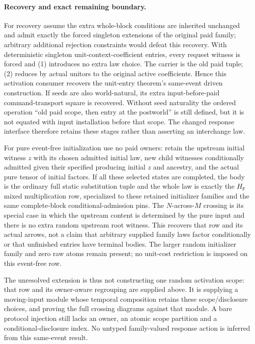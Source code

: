 \documentclass[11pt]{article}
\begin{document}
\paragraph{Recovery and exact remaining boundary.}
For recovery assume the extra whole-block conditions are inherited unchanged and admit exactly the forced singleton extensions of the original paid family; arbitrary additional rejection constraints would defeat this recovery. With deterministic singleton unit-context-coefficient entries, every request witness is forced and (1) introduces no extra law choice. The carrier is the old paid tuple; (2) reduces by actual unitors to the original active coefficients. Hence this activation consumer recovers the unit-entry theorem's same-event driven construction. If seeds are also world-natural, its extra input-before-paid command-transport square is recovered. Without seed naturality the ordered operation ``old paid scope, then entry at the postworld'' is still defined, but it is not equated with input installation before that scope. The changed response interface therefore retains these stages rather than asserting an interchange law.

For pure event-free initialization use no paid owners: retain the upstream initial witness $z$ with its chosen admitted initial law, new child witnesses conditionally admitted given their specified producing initial $z$ and ancestry, and the actual pure tensor of initial factors. If all these selected states are completed, the body is the ordinary full static substitution tuple and the whole law is exactly the $H_{\mathsf F}$ mixed multiplication row, specialized to these retained initializer families and the same complete-block conditional-admission pins. The $N$-across-$M$ crossing is its special case in which the upstream content is determined by the pure input and there is no extra random upstream root witness. This recovers that row and its actual arrows, not a claim that arbitrary supplied family laws factor conditionally or that unfinished entries have terminal bodies. The larger random initializer family and zero raw atoms remain present; no unit-cost restriction is imposed on this event-free row.

The unresolved extension is thus not constructing one random activation scope: that row and its owner-aware regrouping are supplied above. It is supplying a moving-input module whose temporal composition retains these scope/disclosure choices, and proving the full crossing diagrams against that module. A bare protocol injection still lacks an owner, an atomic scope partition and a conditional-disclosure index. No untyped family-valued response action is inferred from this same-event result.
\end{document}
